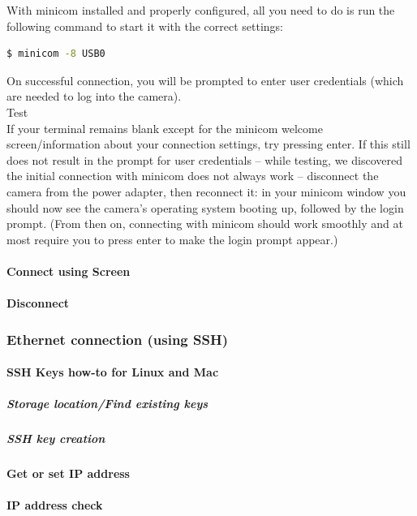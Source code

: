 With minicom installed and properly configured, all you need to do is run the following command to start it with the correct settings:

\begin{lstlisting}[language=bash,morekeywords=$,keywordstyle=\bfseries,frame=none,xleftmargin=.25in,belowskip=2em, aboveskip=2em]
$ minicom -8 USB0
\end{lstlisting}

On successful connection, you will be prompted to enter user credentials (which are needed to log into the camera).\\

Test\\

If your terminal remains blank except for the minicom welcome screen/information about your connection settings, try pressing enter. If this still does not result in the prompt for user credentials – while testing, we discovered the initial connection with minicom does not always work – disconnect the camera from the power adapter, then reconnect it: in your minicom window you should now see the camera's operating system booting up, followed by the login prompt. (From then on, connecting with minicom should work smoothly and at most require you to press enter to make the login prompt appear.)

\paragraph{Connect using Screen}
\paragraph{Disconnect}
\subsubsection{Ethernet connection (using SSH)}
\paragraph{SSH Keys how-to for Linux and Mac}
\subparagraph{Storage location/Find existing keys}
\subparagraph{SSH key creation}
\paragraph{Get or set IP address}
\paragraph{IP address check}
